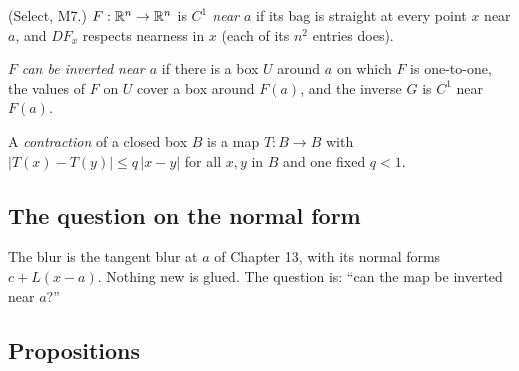 \begin{lines}
\item[\lab{D1}] (Select, M7.) $F : \mathbb{R}^n \to \mathbb{R}^n$ is \emph{$C^1$ near $a$} if its bag is straight at every point $x$ near $a$, and $DF_x$ respects nearness in $x$ (each of its $n^2$ entries does).
\item[\lab{D2}] $F$ \emph{can be inverted near $a$} if there is a box $U$ around $a$ on which $F$ is one-to-one, the values of $F$ on $U$ cover a box around $F(a)$, and the inverse $G$ is $C^1$ near $F(a)$.
\item[\lab{D3}] A \emph{contraction} of a closed box $B$ is a map $T : B \to B$ with $|T(x) - T(y)| \le q\,|x - y|$ for all $x, y$ in $B$ and one fixed $q < 1$.
\end{lines}

\subsection*{The question on the normal form}

The blur is the tangent blur at $a$ of Chapter 13, with its normal forms $c + L(x - a)$. Nothing new is glued. The question is: ``can the map be inverted near $a$?''

\subsection*{Propositions}

